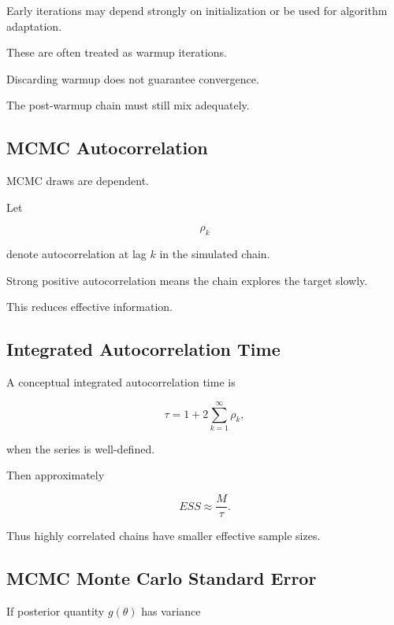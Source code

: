 Early iterations may depend strongly on initialization or be used for
algorithm adaptation.

These are often treated as warmup iterations.

Discarding warmup does not guarantee convergence.

The post-warmup chain must still mix adequately.

\subsection{MCMC Autocorrelation}
\label{subsec:mcmc-autocorrelation-computational}

MCMC draws are dependent.

Let

\[
\rho_k
\]

denote autocorrelation at lag \(k\) in the simulated chain.

Strong positive autocorrelation means the chain explores the target
slowly.

This reduces effective information.

\subsection{Integrated Autocorrelation Time}
\label{subsec:integrated-autocorrelation-time}

A conceptual integrated autocorrelation time is

\[
\boxed{
\tau
=
1
+
2
\sum_{k=1}^{\infty}
\rho_k,
}
\]

when the series is well-defined.

Then approximately

\[
\boxed{
ESS
\approx
\frac{
M
}{
\tau
}.
}
\]

Thus highly correlated chains have smaller effective sample sizes.

\subsection{MCMC Monte Carlo Standard Error}
\label{subsec:mcmc-mcse}

If posterior quantity \(g(\theta)\) has variance


